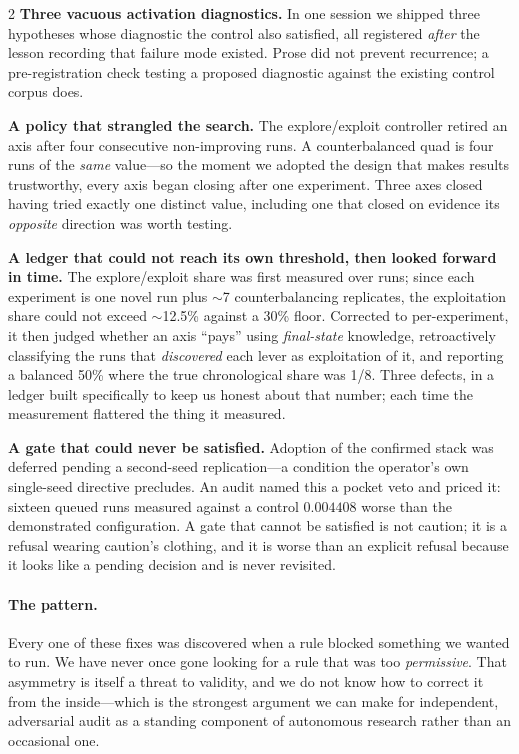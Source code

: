 \documentclass[10pt]{article}
\begin{document}
\begin{multicols}{2}
\textbf{Three vacuous activation diagnostics.} In one session we shipped three hypotheses
whose diagnostic the control also satisfied, all registered \emph{after} the lesson
recording that failure mode existed. Prose did not prevent recurrence; a pre-registration
check testing a proposed diagnostic against the existing control corpus does.

\textbf{A policy that strangled the search.} The explore/exploit controller retired an axis
after four consecutive non-improving runs. A counterbalanced quad is four runs of the
\emph{same} value---so the moment we adopted the design that makes results trustworthy,
every axis began closing after one experiment. Three axes closed having tried exactly one
distinct value, including one that closed on evidence its \emph{opposite} direction was
worth testing.

\textbf{A ledger that could not reach its own threshold, then looked forward in time.} The
explore/exploit share was first measured over runs; since each experiment is one novel run
plus $\sim$7 counterbalancing replicates, the exploitation share could not exceed
$\sim$12.5\% against a 30\% floor. Corrected to per-experiment, it then judged whether an
axis ``pays'' using \emph{final-state} knowledge, retroactively classifying the runs that
\emph{discovered} each lever as exploitation of it, and reporting a balanced 50\% where the
true chronological share was 1/8. Three defects, in a ledger built specifically to keep us
honest about that number; each time the measurement flattered the thing it measured.

\textbf{A gate that could never be satisfied.} Adoption of the confirmed stack was deferred
pending a second-seed replication---a condition the operator's own single-seed directive
precludes. An audit named this a pocket veto and priced it: sixteen queued runs measured
against a control $0.004408$ worse than the demonstrated configuration. A gate that cannot
be satisfied is not caution; it is a refusal wearing caution's clothing, and it is worse
than an explicit refusal because it looks like a pending decision and is never revisited.

\paragraph{The pattern.} Every one of these fixes was discovered when a rule blocked
something we wanted to run. We have never once gone looking for a rule that was too
\emph{permissive}. That asymmetry is itself a threat to validity, and we do not know how to
correct it from the inside---which is the strongest argument we can make for independent,
adversarial audit as a standing component of autonomous research rather than an occasional
one.


\end{multicols}
\end{document}
